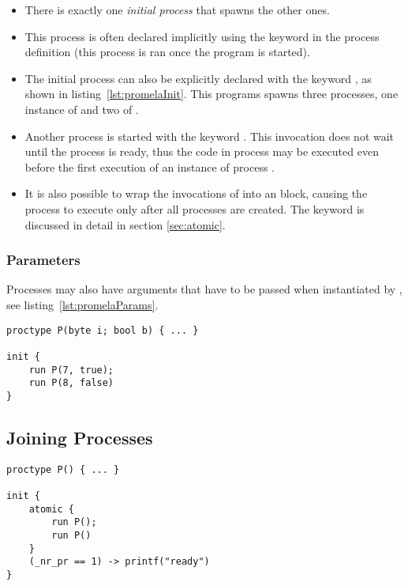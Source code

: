		\begin{itemize}
			\item There is exactly one \textit{initial process} that spawns the other ones.
			\item This process is often declared implicitly using the keyword  in the process definition (this process is ran once the program is started).
			\item The initial process can also be explicitly declared with the keyword , as shown in listing~\ref{lst:promelaInit}. This programs spawns three processes, one instance of  and two of .
			\item Another process is started with the keyword . This invocation does not wait until the process is ready, thus the code in process  may be executed even before the first execution of an instance of process .
			\item It is also possible to wrap the invocations of  into an  block, causing the process to execute only after all processes are created. The keyword  is discussed in detail in section \ref{sec:atomic}.
		\end{itemize}

		\subsubsection{Parameters}
			Processes may also have arguments that have to be passed when instantiated by , see listing~\ref{lst:promelaParams}.

			\begin{lstlisting}[caption = { PROMELA Processes with Parameters }, label = lst:promelaParams, language = PROMELA]
proctype P(byte i; bool b) { ... }

init {
	run P(7, true);
	run P(8, false)
}
				\end{lstlisting}

	\subsection{Joining Processes}
		\begin{lstlisting}[caption = { Joining PROMELA Processes }, label = lst:promelaJoin, language = PROMELA]
proctype P() { ... }

init {
	atomic {
		run P();
		run P()
	}
	(_nr_pr == 1) -> printf("ready")
}
			\end{lstlisting}

